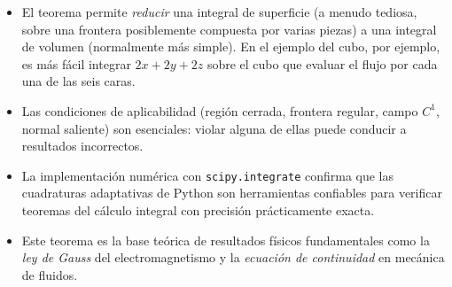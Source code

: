 \documentclass[12pt,a4paper]{article}
\begin{document}
\begin{itemize}[leftmargin=1.5cm]
    \item El teorema permite \emph{reducir} una integral de superficie (a menudo tediosa, sobre una frontera posiblemente compuesta por varias piezas) a una integral de volumen (normalmente más simple). En el ejemplo del cubo, por ejemplo, es más fácil integrar $2x+2y+2z$ sobre el cubo que evaluar el flujo por cada una de las seis caras.
    \item Las condiciones de aplicabilidad (región cerrada, frontera regular, campo $C^1$, normal saliente) son esenciales: violar alguna de ellas puede conducir a resultados incorrectos.
    \item La implementación numérica con \texttt{scipy.integrate} confirma que las cuadraturas adaptativas de Python son herramientas confiables para verificar teoremas del cálculo integral con precisión prácticamente exacta.
    \item Este teorema es la base teórica de resultados físicos fundamentales como la \emph{ley de Gauss} del electromagnetismo y la \emph{ecuación de continuidad} en mecánica de fluidos.
\end{itemize}
\end{document}

